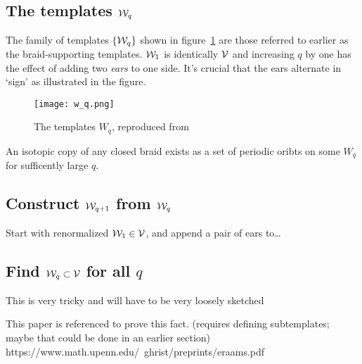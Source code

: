 \documentclass[paper.tex]{subfiles}
\begin{document}
\subsection{The templates $\mathcal{W}_q$}

The family of templates $\{ \mathcal{W}_q \}$ shown in figure~\ref{fig:w_q} are those referred to earlier as the braid-supporting templates. $\mathcal{W}_1$ is identically $\mathcal{V}$ and increasing $q$ by one has the effect of adding
two \emph{ears} to one side. It's crucial that the ears alternate in `sign' as illustrated in the figure.

\begin{figure}[h]
  \centering
  \texttt{[image: w\_q.png]}
  \caption{The templates $W_q$, reproduced from~\cite{knottyode}}\label{fig:w_q}
\end{figure}


An isotopic copy of any closed braid exists as a set of periodic oribts on some $W_q$ for sufficently large $q$.


\subsection{Construct $\mathcal{W}_{q+1}$ from $\mathcal{W}_q$}

Start with renormalized $\mathcal{W}_1 \in \mathcal{V}$, and append a pair of ears to\dots

\subsection{Find $\mathcal{W}_q \subset \mathcal{V}$ for all $q$}

This is very tricky and will have to be very loosely sketched

This paper is referenced to prove this fact. (requires defining subtemplates; maybe that could be done in an earlier section)
https://www.math.upenn.edu/~ghrist/preprints/eraams.pdf
\end{document}
